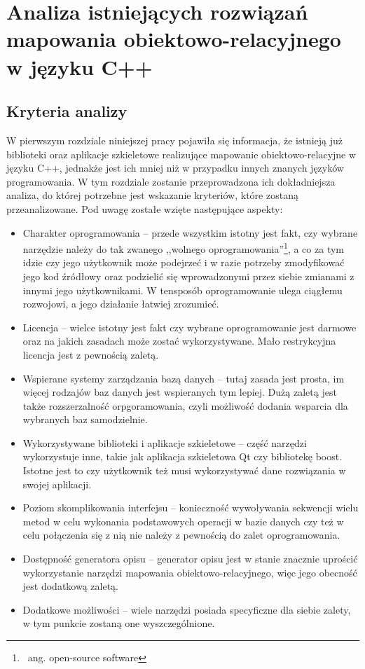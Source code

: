 \documentclass[12pt]{report}
\begin{document}
\chapter[Analiza istniejących rozwiązań]{Analiza istniejących rozwiązań mapowania obiektowo-relacyjnego w języku C++} \label{analiza}

\section{Kryteria analizy}

W pierwszym rozdziale niniejszej pracy pojawiła się informacja, że istnieją już biblioteki oraz aplikacje szkieletowe realizujące mapowanie obiektowo-relacyjne w języku C++,
jednakże jest ich mniej niż w przypadku innych znanych języków programowania. W tym rozdziale zostanie przeprowadzona ich dokładniejsza analiza, do której potrzebne
jest wskazanie kryteriów, które zostaną przeanalizowane. Pod uwagę zostałe wzięte następujące aspekty:

\begin{itemize}
\item Charakter oprogramowania -- przede wszystkim istotny jest fakt, czy wybrane narzędzie należy do tak zwanego ,,wolnego oprogramowania''\footnote{~ang. open-source
software}, a co za tym idzie czy jego użytkownik może podejrzeć i w razie potrzeby zmodyfikować jego kod źródłowy oraz podzielić się wprowadzonymi przez siebie zmianami z innymi 
jego użytkownikami. W tensposób oprogramowanie ulega ciągłemu rozwojowi, a jego działanie łatwiej zrozumieć.
\item Licencja -- wielce istotny jest fakt czy wybrane oprogramowanie jest darmowe oraz na jakich zasadach może zostać wykorzystywane. Mało restrykcyjna licencja jest z
pewnością zaletą.
\item Wspierane systemy zarządzania bazą danych -- tutaj zasada jest prosta, im więcej rodzajów baz danych jest wspieranych tym lepiej. Dużą zaletą jest także rozszerzalność
orpgoramowania, czyli możliwość dodania wsparcia dla wybranych baz samodzielnie.
\item Wykorzystywane biblioteki i aplikacje szkieletowe -- część narzędzi wykorzystuje inne, takie jak aplikacja szkieletowa Qt czy bibliotekę boost. Istotne jest to czy użytkownik
też musi wykorzystywać dane rozwiązania w swojej aplikacji.
\item Poziom skomplikowania interfejsu -- konieczność wywoływania sekwencji wielu metod w celu wykonania podstawowych operacji w bazie danych czy też w celu połączenia
się z nią nie należy z pewnością do zalet oprogramowania.
\item Dostępność generatora opisu -- generator opisu jest w stanie znacznie uprościć wykorzystanie narzędzi mapowania obiektowo-relacyjnego, więc jego obecność jest
dodatkową zaletą.
\item Dodatkowe możliwości -- wiele narzędzi posiada specyficzne dla siebie zalety, w tym punkcie zostaną one wyszczególnione.
\end{itemize}
\end{document}
